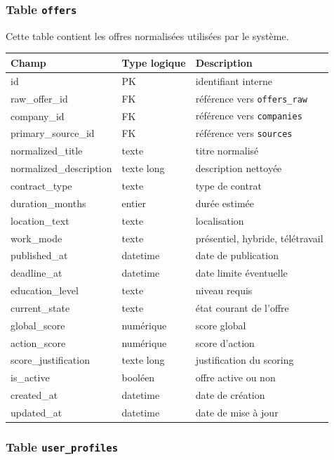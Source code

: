 \documentclass[11pt,a4paper]{article}
\begin{document}
\subsubsection{Table \texttt{offers}}

Cette table contient les offres normalisées utilisées par le système.

\begin{center}
\begin{tabular}{|l|l|l|}
\hline
\textbf{Champ} & \textbf{Type logique} & \textbf{Description} \\
\hline
id & PK & identifiant interne \\
raw_offer_id & FK & référence vers \texttt{offers\_raw} \\
company_id & FK & référence vers \texttt{companies} \\
primary_source_id & FK & référence vers \texttt{sources} \\
normalized_title & texte & titre normalisé \\
normalized_description & texte long & description nettoyée \\
contract_type & texte & type de contrat \\
duration_months & entier & durée estimée \\
location_text & texte & localisation \\
work_mode & texte & présentiel, hybride, télétravail \\
published_at & datetime & date de publication \\
deadline_at & datetime & date limite éventuelle \\
education_level & texte & niveau requis \\
current_state & texte & état courant de l’offre \\
global_score & numérique & score global \\
action_score & numérique & score d’action \\
score_justification & texte long & justification du scoring \\
is_active & booléen & offre active ou non \\
created_at & datetime & date de création \\
updated_at & datetime & date de mise à jour \\
\hline
\end{tabular}
\end{center}

\subsubsection{Table \texttt{user\_profiles}}
\end{document}

